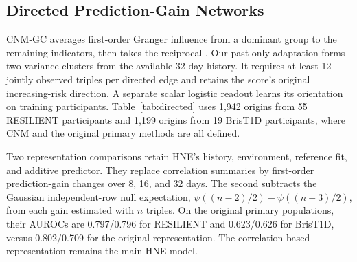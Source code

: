 \subsection{Directed Prediction-Gain Networks}
CNM-GC averages first-order Granger influence from a dominant group to the remaining indicators, then takes the reciprocal \citep{hneM16}. Our past-only adaptation forms two variance clusters from the available 32-day history. It requires at least 12 jointly observed triples per directed edge and retains the score's original increasing-risk direction. A separate scalar logistic readout learns its orientation on training participants. Table~\ref{tab:directed} uses 1,942 origins from 55 RESILIENT participants and 1,199 origins from 19 BrisT1D participants, where CNM and the original primary methods are all defined.

Two representation comparisons retain HNE's history, environment, reference fit, and additive predictor. They replace correlation summaries by first-order prediction-gain changes over 8, 16, and 32 days. The second subtracts the Gaussian independent-row null expectation, $\psi((n-2)/2)-\psi((n-3)/2)$, from each gain estimated with $n$ triples. On the original primary populations, their AUROCs are 0.797/0.796 for RESILIENT and 0.623/0.626 for BrisT1D, versus 0.802/0.709 for the original representation. The correlation-based representation remains the main HNE model.

\begin{table}[t]
\centering
\small\setlength{\tabcolsep}{5pt}
\caption{Past-only directed markers and network representations on their common scored origins. Within is mean within-participant AUROC; intervals resample participants.}
\label{tab:directed}

\end{table}
